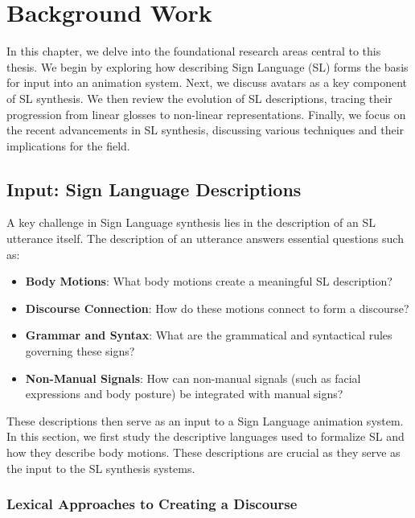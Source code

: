 \documentclass[../../main.tex]{subfiles}
\begin{document}
\chapter{Background Work}
\label{ch:background_work}

In this chapter, we delve into the foundational research areas central to this thesis. We begin by exploring how describing Sign Language (SL) forms the basis for input into an animation system. Next, we discuss avatars as a key component of SL synthesis. We then review the evolution of SL descriptions, tracing their progression from linear glosses to non-linear representations. Finally, we focus on the recent advancements in SL synthesis, discussing various techniques and their implications for the field.

\section{Input: Sign Language Descriptions}
\label{ch:background_work:sign_language_descriptions}

A key challenge in Sign Language synthesis lies in the description of an SL utterance itself. The description of an utterance answers essential questions such as:

\begin{itemize}
  \item \textbf{Body Motions}: What body motions create a meaningful SL description?
  \item \textbf{Discourse Connection}: How do these motions connect to form a discourse?
  \item \textbf{Grammar and Syntax}: What are the grammatical and syntactical rules governing these signs?
  \item \textbf{Non-Manual Signals}: How can non-manual signals (such as facial expressions and body posture) be integrated with manual signs?
\end{itemize}

These descriptions then serve as an input to a Sign Language animation system. In this section, we first study the descriptive languages used to formalize SL and how they describe body motions. These descriptions are crucial as they serve as the input to the SL synthesis systems.

\subsection{Lexical Approaches to Creating a Discourse}
\label{ch:background_work:sign_language_descriptions:lexical_approaches}
\end{document}
